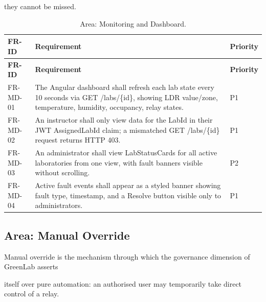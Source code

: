 they cannot be missed.

\begin{longtable}{|L{2.0cm}|L{12.0cm}|L{1.5cm}|}
	\caption{Area: Monitoring and Dashboard.} \label{tab:3-12}                                                                                                                                             \\
	\hline
	\textbf{FR-ID} & \textbf{Requirement}                                                                                                                                              & \textbf{Priority} \\
	\hline
	\endfirsthead
	\hline
	\textbf{FR-ID} & \textbf{Requirement}                                                                                                                                              & \textbf{Priority} \\
	\hline
	\endhead
	\hline
	\endfoot
	\hline
	\endlastfoot
	FR-MD-01       & The Angular dashboard shall refresh each lab state every 10 seconds via GET /labs/\{id\}, showing LDR value/zone, temperature, humidity, occupancy, relay states. & P1                \\
	\hline
	FR-MD-02       & An instructor shall only view data for the LabId in their JWT AssignedLabId claim; a mismatched GET /labs/\{id\} request returns HTTP 403.                        & P1                \\
	\hline
	FR-MD-03       & An administrator shall view LabStatusCards for all active laboratories from one view, with fault banners visible without scrolling.                               & P2                \\
	\hline
	FR-MD-04       & Active fault events shall appear as a styled banner showing fault type, timestamp, and a Resolve button visible only to administrators.                           & P1                \\
	\hline
\end{longtable}


\subsection{Area: Manual Override}
Manual override is the mechanism through which the governance dimension of GreenLab asserts

itself over pure automation: an authorised user may temporarily take direct control of a relay.

